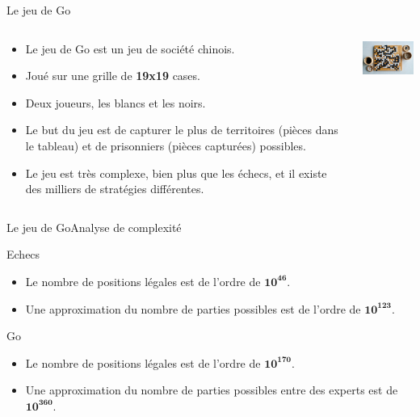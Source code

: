 \begin{frame}{Le jeu de Go}
    \begin{block}{}
        \begin{columns}
            \begin{column}{8cm}
                \begin{itemize}
                    \item Le jeu de Go est un jeu de société chinois.
                    \item Joué sur une grille de \textbf{19x19} cases.
                    \item Deux joueurs, les blancs et les noirs.
                    \item Le but du jeu est de capturer le plus de territoires (pièces dans le tableau) et de prisonniers (pièces capturées) possibles.
                    \item Le jeu est très complexe, bien plus que les échecs, et il existe des milliers de stratégies différentes.
                \end{itemize}
            \end{column}
            \begin{column}{3cm}
                \includegraphics[width=3cm]{ressources/Go/Go_tableau}
            \end{column}
        \end{columns}
    \end{block}
\end{frame}


\begin{frame}{Le jeu de Go}{Analyse de complexité}
    \begin{block}{Echecs}
        \begin{itemize}
            \item Le nombre de positions légales est de l'ordre de $\mathbf{10^{46}}$.
            \item Une approximation du nombre de parties possibles est de l'ordre de $\mathbf{10^{123}}$.
        \end{itemize}
    \end{block}
    \pause
    \begin{alertblock}{Go}
        \begin{itemize}
            \item Le nombre de positions légales est de l'ordre de $\mathbf{10^{170}}$.
            \item Une approximation du nombre de parties possibles entre des experts est de $\mathbf{10^{360}}$.
        \end{itemize}
    \end{alertblock}
\end{frame}

